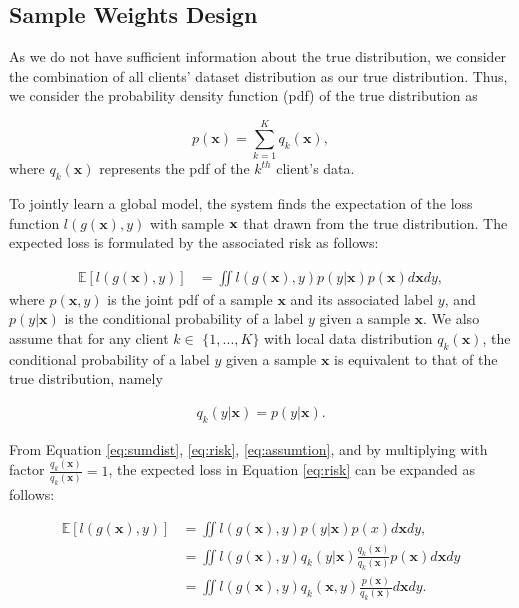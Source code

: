 \subsection{Sample Weights Design}
As we do not have sufficient information about the true distribution, we consider the combination of all clients' dataset distribution as our true distribution. Thus, we consider the probability density function (pdf) of the true distribution as 

\begin{equation}
\label{eq:sumdist}
p(\mathbf{x}) = \sum_{k=1}^{K}q_k(\mathbf{x}) ,
\end{equation}
where $q_k(\mathbf{x})$ represents the pdf of the $k^{th}$ client's data. 

To jointly learn a global model, the system finds the expectation of the loss function $l(g(\mathbf{x}),y)$ with sample $\mathbf{x}{}$ that drawn from the true distribution. The expected loss is formulated by the associated risk \cite{noauthor_empirical_2021} as follows:

\begin{align}
\mathbb{E}[l(g(\mathbf{x}),y)] 
&= \iint l(g(\mathbf{x}),y) p(y|\mathbf{\mathbf{x}}) p(\mathbf{x}) d\mathbf{x}dy, \label{eq:risk} 
\end{align}
where $p(\mathbf{x},y)$ is the joint pdf of a sample $\mathbf{x}$ and its associated label $y$, and $p(y|\mathbf{x})$ is the conditional probability of a label $y$ given a sample $\mathbf{x}$. We also assume that for any client $k \in$ $\{1,...,K\}$ with local data distribution $q_k(\mathbf{x})$, the conditional probability of a label $y$ given a sample $\mathbf{x}$ is equivalent to that of the true distribution, namely

\begin{align}
\label{eq:assumtion}
q_k(y|\mathbf{x}) = p(y|\mathbf{x}).
\end{align}

From Equation \ref{eq:sumdist}, \ref{eq:risk}, \ref{eq:assumtion}, and by multiplying with factor $\frac{q_k(\mathbf{x})}{q_k(\mathbf{x})}=1$, the expected loss in Equation \ref{eq:risk} can be expanded as follows:

\begin{align}
\mathbb{E}[l(g(\mathbf{x}),y)]  &= \iint l(g(\mathbf{x}),y) p(y|\mathbf{x}) p(x) d\mathbf{x}dy,\\
&= \iint l(g(\mathbf{x}),y) q_k(y|\mathbf{x}) \frac{q_k(\mathbf{x})}{q_k(\mathbf{x})}  p(\mathbf{x}) d\mathbf{x}dy \\
&= \iint l(g(\mathbf{x}),y) q_k(\mathbf{x},y) \frac{p(\mathbf{x})}{q_k(\mathbf{x})}  d\mathbf{x}dy.    \label{eq:expectedloss}
\end{align}

